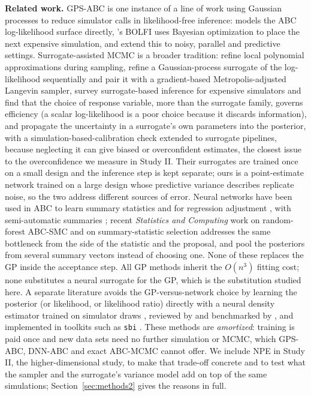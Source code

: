 \documentclass[sn-basic,iicol,pdflatex]{sn-jnl}
\begin{document}
\noindent\textbf{Related work.} GPS-ABC is one instance of a line of work using
Gaussian processes to reduce simulator calls in likelihood-free inference:
\citet{wilkinson2014} models the ABC log-likelihood surface directly,
\citet{gutmann2016}'s BOLFI uses Bayesian optimization to place the next
expensive simulation, and \citet{jarvenpaa2021,jarvenpaa2023} extend this to
noisy, parallel and predictive settings. Surrogate-assisted MCMC is a broader tradition: \citet{conrad2016} refine local polynomial approximations during sampling, \citet{perrin2026} refine a Gaussian-process surrogate of the log-likelihood sequentially and pair it with a gradient-based Metropolis-adjusted Langevin sampler, \citet{soldat2026} survey surrogate-based inference for expensive simulators and find that the choice of response variable, more than the surrogate family, governs efficiency (a scalar log-likelihood is a poor choice because it discards information), and \citet{reiser2025} propagate the uncertainty in a surrogate's own parameters into the posterior, with a simulation-based-calibration check extended to surrogate pipelines, because neglecting it can give biased or overconfident estimates, the closest issue to the overconfidence we measure in Study II. Their surrogates are trained once on a small design and the inference step is kept separate; ours is a point-estimate network trained on a large design whose predictive variance describes replicate noise, so the two address different sources of error. Neural networks have been used in ABC to learn summary statistics \citep{jiang2017} and for regression adjustment \citep{blum2010}, with semi-automatic summaries \citep{fearnhead2012}; recent \emph{Statistics and Computing} work on random-forest ABC-SMC \citep{dinh2025} and on summary-statistic selection \citep{hoffmann2026} addresses the same bottleneck from the side of the statistic and the proposal, and \citet{frazier2025} pool the posteriors from several summary vectors instead of choosing one. None of these replaces the GP inside the acceptance step. All GP methods inherit the $O(n^3)$ fitting cost;
none substitutes a neural surrogate for the GP, which is the substitution
studied here. A separate literature avoids the GP-versus-network choice by
learning the posterior (or likelihood, or likelihood ratio) directly with a
neural density estimator trained on simulator draws
\citep{papamakarios2016,papamakarios2019,greenberg2019,cranmer2020,radev2022}, reviewed by \citet{zammit2025} and benchmarked by \citet{lueckmann2021}, and implemented in toolkits such
as \texttt{sbi} \citep{tejerocantero2020}. These methods are \emph{amortized}:
training is paid once and new data sets need no further simulation or MCMC,
which GPS-ABC, DNN-ABC and exact ABC-MCMC cannot offer. We include NPE in Study II, the higher-dimensional
study, to make that trade-off concrete and to test what the sampler and the surrogate's variance model add on top of the same
simulations; Section~\ref{sec:methods2} gives the reasons in full.
\end{document}

